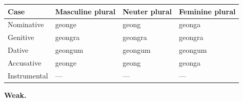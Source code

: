 \par\begin{minipage}{\linewidth}\raggedright
\setlength{\LTleft}{0pt}\setlength{\LTright}{\fill}
\noindent
\begin{tabular}{@{}>{\raggedright\arraybackslash}p{22mm}>{\raggedright\arraybackslash}p{31.18mm}>{\raggedright\arraybackslash}p{31.18mm}>{\raggedright\arraybackslash}p{31.18mm}@{}}
\toprule
\textbf{Case} & \textbf{Masculine plural} & \textbf{Neuter plural} & \textbf{Feminine plural} \\
\midrule
Nominative & geonge & geong & geonga \\
Genitive & geongra & geongra & geongra \\
Dative & geongum & geongum & geongum \\
Accusative & geonge & geong & geonga \\
Instrumental & — & — & — \\
\bottomrule
\end{tabular}
\end{minipage}\par
\par\endgroup
\par\addvspace{5pt}

\textbf{Weak.}

